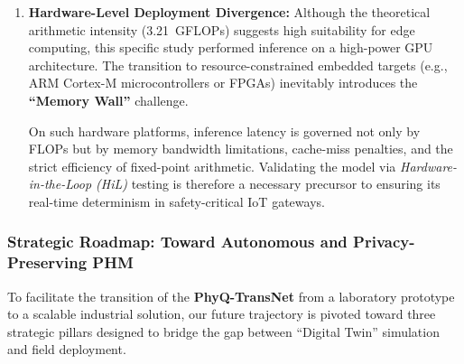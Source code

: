 \documentclass[5p,times,twocolumn]{elsarticle}
\begin{document}
\begin{enumerate}
    \item \textbf{Hardware-Level Deployment Divergence:} 
    Although the theoretical arithmetic intensity (\SI{3.21}{GFLOPs}) suggests high suitability for edge computing, this specific study performed inference on a high-power GPU architecture. The transition to resource-constrained embedded targets (e.g., ARM Cortex-M microcontrollers or FPGAs) inevitably introduces the \textbf{``Memory Wall''} challenge. 
    
    

    On such hardware platforms, inference latency is governed not only by FLOPs but by memory bandwidth limitations, cache-miss penalties, and the strict efficiency of fixed-point arithmetic. Validating the model via \textit{Hardware-in-the-Loop (HiL)} testing is therefore a necessary precursor to ensuring its real-time determinism in safety-critical IoT gateways.
\end{enumerate}

\subsubsection{Strategic Roadmap: Toward Autonomous and Privacy-Preserving PHM}
To facilitate the transition of the \textbf{PhyQ-TransNet} from a laboratory prototype to a scalable industrial solution, our future trajectory is pivoted toward three strategic pillars designed to bridge the gap between ``Digital Twin'' simulation and field deployment.
\end{document}
